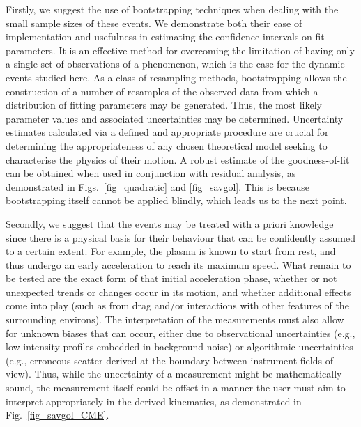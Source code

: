 \documentclass[structabstract]{aa}
\begin{document}
Firstly, we suggest the use of bootstrapping techniques when dealing with the small sample sizes of these events. We demonstrate both their ease of implementation and usefulness in estimating the confidence intervals on fit parameters. It is an effective method for overcoming the limitation of having only a single set of observations of a phenomenon, which is the case for the dynamic events studied here. As a class of resampling methods, bootstrapping allows the construction of a number of resamples of the observed data from which a distribution of fitting parameters may be generated. Thus, the most likely parameter values and associated uncertainties may be determined. Uncertainty estimates calculated via a defined and appropriate procedure are crucial for determining the appropriateness of any chosen theoretical model seeking to characterise the physics of their motion. A robust estimate of the goodness-of-fit can be obtained when used in conjunction with residual analysis, as demonstrated in Figs.~\ref{fig_quadratic} and \ref{fig_savgol}. This is because bootstrapping itself cannot be applied blindly, which leads us to the next point.

Secondly, we suggest that the events may be treated with a priori knowledge since there is a physical basis for their behaviour that can be confidently assumed to a certain extent. For example, the plasma is known to start from rest, and thus undergo an early acceleration to reach its maximum speed. What remain to be tested are the exact form of that initial acceleration phase, whether or not unexpected trends or changes occur in its motion, and whether additional effects come into play (such as from drag and/or interactions with other features of the surrounding environs). The interpretation of the measurements must also allow for unknown biases that can occur, either due to observational uncertainties (e.g., low intensity profiles embedded in background noise) or algorithmic uncertainties (e.g., erroneous scatter derived at the boundary between instrument fields-of-view). Thus, while the uncertainty of a measurement might be mathematically sound, the measurement itself could be offset in a manner the user must aim to interpret appropriately in the derived kinematics, as demonstrated in Fig.~\ref{fig_savgol_CME}.
\end{document}
